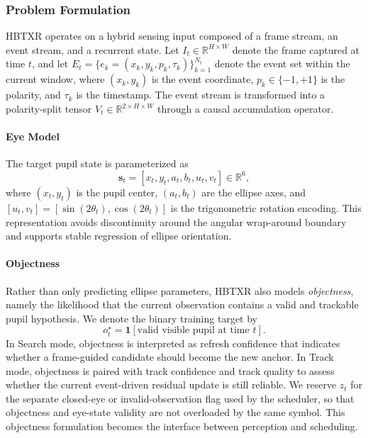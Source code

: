 \documentclass[journal]{IEEEtran}
\newcommand{\R}{\mathbb{R}}
\begin{document}
\subsubsection{Problem Formulation}
HBTXR operates on a hybrid sensing input composed of a frame stream, an event stream, and a recurrent state. Let $I_t \in \R^{H\times W}$ denote the frame captured at time $t$, and let $E_t = \{e_k=(x_k,y_k,p_k,\tau_k)\}_{k=1}^{N_t}$ denote the event set within the current window, where $(x_k,y_k)$ is the event coordinate, $p_k \in \{-1,+1\}$ is the polarity, and $\tau_k$ is the timestamp. The event stream is transformed into a polarity-split tensor $V_t \in \R^{2\times H\times W}$ through a causal accumulation operator.

\paragraph*{Eye Model}
The target pupil state is parameterized as
\begin{equation}
\mathbf{s}_t = [x_t, y_t, a_t, b_t, u_t, v_t] \in \R^{6},
\end{equation}
where $(x_t,y_t)$ is the pupil center, $(a_t,b_t)$ are the ellipse axes, and $[u_t,v_t]=[\sin(2\theta_t),\cos(2\theta_t)]$ is the trigonometric rotation encoding. This representation avoids discontinuity around the angular wrap-around boundary and supports stable regression of ellipse orientation.

\paragraph*{Objectness}
Rather than only predicting ellipse parameters, HBTXR also models \emph{objectness}, namely the likelihood that the current observation contains a valid and trackable pupil hypothesis. We denote the binary training target by
\begin{equation}
o_t^{\star}=\mathbf{1}[\text{valid visible pupil at time } t].
\end{equation}
In Search mode, objectness is interpreted as refresh confidence that indicates whether a frame-guided candidate should become the new anchor. In Track mode, objectness is paired with track confidence and track quality to assess whether the current event-driven residual update is still reliable. We reserve $z_t$ for the separate closed-eye or invalid-observation flag used by the scheduler, so that objectness and eye-state validity are not overloaded by the same symbol. This objectness formulation becomes the interface between perception and scheduling.
\end{document}
